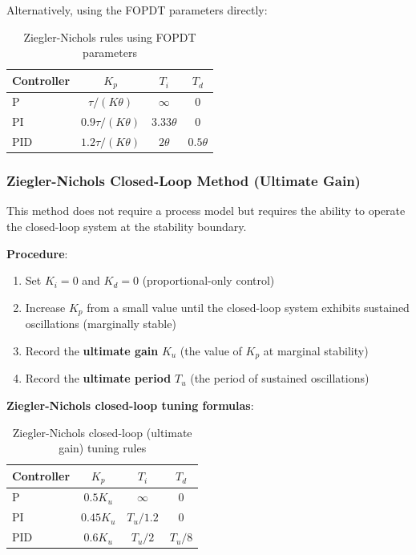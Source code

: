 Alternatively, using the FOPDT parameters directly:

\begin{table}[htbp]
\centering
\caption{Ziegler-Nichols rules using FOPDT parameters}
\label{tab:zn_fopdt}
\begin{tabular}{@{}lccc@{}}
\toprule
\textbf{Controller} & $K_p$ & $T_i$ & $T_d$ \\
\midrule
P & $\tau/(K\theta)$ & $\infty$ & 0 \\
PI & $0.9\tau/(K\theta)$ & $3.33\theta$ & 0 \\
PID & $1.2\tau/(K\theta)$ & $2\theta$ & $0.5\theta$ \\
\bottomrule
\end{tabular}
\end{table}

\subsubsection{Ziegler-Nichols Closed-Loop Method (Ultimate Gain)}

This method does not require a process model but requires the ability to operate the closed-loop system at the stability boundary.

\textbf{Procedure}:
\begin{enumerate}
    \item Set $K_i = 0$ and $K_d = 0$ (proportional-only control)
    \item Increase $K_p$ from a small value until the closed-loop system exhibits sustained oscillations (marginally stable)
    \item Record the \textbf{ultimate gain} $K_u$ (the value of $K_p$ at marginal stability)
    \item Record the \textbf{ultimate period} $T_u$ (the period of sustained oscillations)
\end{enumerate}

\textbf{Ziegler-Nichols closed-loop tuning formulas}:

\begin{table}[htbp]
\centering
\caption{Ziegler-Nichols closed-loop (ultimate gain) tuning rules}
\label{tab:zn_closed_loop}
\begin{tabular}{@{}lccc@{}}
\toprule
\textbf{Controller} & $K_p$ & $T_i$ & $T_d$ \\
\midrule
P & $0.5 K_u$ & $\infty$ & 0 \\
PI & $0.45 K_u$ & $T_u/1.2$ & 0 \\
PID & $0.6 K_u$ & $T_u/2$ & $T_u/8$ \\
\bottomrule
\end{tabular}
\end{table}


